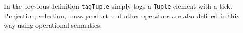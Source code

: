 In the previous definition \texttt{tagTuple} simply tags a \texttt{Tuple} element with a tick. Projection, selection, cross product and other operators are also defined in this way using operational semantics.  

